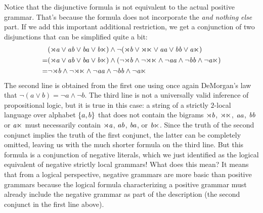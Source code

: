 Notice that the disjunctive formula is not equivalent to the actual positive grammar.
That's because the formula does not incorporate the \emph{and nothing else} part.
If we add this important additional restriction, we get a conjunction of two disjunctions that can be simplified quite a bit:
%
\begin{align*}
    &
    (
    \mathit{\rtimes a}
    \vee
    \mathit{ab}
    \vee
    \mathit{ba}
    \vee
    \mathit{b\ltimes}
    )
    \wedge
    \neg
    (
    \mathit{\rtimes b}
    \vee
    \mathit{\rtimes \ltimes}
    \vee
    \mathit{aa}
    \vee
    \mathit{bb}
    \vee
    \mathit{a\ltimes}
    )
    \\
    =
    &
    (
    \mathit{\rtimes a}
    \vee
    \mathit{ab}
    \vee
    \mathit{ba}
    \vee
    \mathit{b\ltimes}
    )
    \wedge
    (
    \neg \mathit{\rtimes b}
    \wedge
    \neg \mathit{\rtimes \ltimes}
    \wedge
    \neg \mathit{aa}
    \wedge
    \neg \mathit{bb}
    \wedge
    \neg \mathit{a\ltimes}
    )
    \\
    =
    &
    \neg \mathit{\rtimes b}
    \wedge
    \neg \mathit{\rtimes \ltimes}
    \wedge
    \neg \mathit{aa}
    \wedge
    \neg \mathit{bb}
    \wedge
    \neg \mathit{a\ltimes}
\end{align*}
%
The second line is obtained from the first one using once again DeMorgan's law that $\neg (a \vee b) = \neg a \wedge \neg b$.
The third line is not a universally valid inference of propositional logic, but it is true in this case: a string of a strictly $2$-local language over alphabet $\left \{ a,b \right \}$ that does not contain the bigrams $\mathit{\rtimes b}$, $\mathit{\rtimes\ltimes}$, $\mathit{aa}$, $\mathit{bb}$ or $\mathit{a \ltimes}$ must necessarily contain $\mathit{\rtimes a}$, $\mathit{ab}$, $\mathit{ba}$, or $\mathit{b\ltimes}$.
Since the truth of the second conjunct implies the truth of the first conjunct, the latter can be completely omitted, leaving us with the much shorter formula on the third line.
But this formula is a conjunction of negative literals, which we just identified as the logical equivalent of negative strictly local grammars!
What does this mean?
It means that from a logical perspective, negative grammars are more basic than positive grammars because the logical formula characterizing a positive grammar must already include the negative grammar as part of the description (the second conjunct in the first line above).

